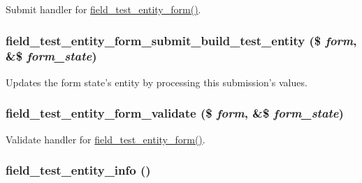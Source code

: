 \label{field__test_8entity_8inc_afd81eae9834f97ca915796f2e9240ef5}
Submit handler for \hyperlink{field__test_8entity_8inc_a85a2c69ad395d255d448d7f3d72ba9f3}{field\_\-test\_\-entity\_\-form()}. \hypertarget{field__test_8entity_8inc_aee4f6831ba19841da21548d86406db01}{
\subsubsection[{field\_\-test\_\-entity\_\-form\_\-submit\_\-build\_\-test\_\-entity}]{\setlength{\rightskip}{0pt plus 5cm}field\_\-test\_\-entity\_\-form\_\-submit\_\-build\_\-test\_\-entity (\$ {\em form}, \/  \&\$ {\em form\_\-state})}}
\label{field__test_8entity_8inc_aee4f6831ba19841da21548d86406db01}
Updates the form state's entity by processing this submission's values. \hypertarget{field__test_8entity_8inc_a223ebb8c79571c498638f329fdefac54}{
\subsubsection[{field\_\-test\_\-entity\_\-form\_\-validate}]{\setlength{\rightskip}{0pt plus 5cm}field\_\-test\_\-entity\_\-form\_\-validate (\$ {\em form}, \/  \&\$ {\em form\_\-state})}}
\label{field__test_8entity_8inc_a223ebb8c79571c498638f329fdefac54}
Validate handler for \hyperlink{field__test_8entity_8inc_a85a2c69ad395d255d448d7f3d72ba9f3}{field\_\-test\_\-entity\_\-form()}. \hypertarget{field__test_8entity_8inc_a51bbbb4d2a09faac17afe13915e29225}{
\subsubsection[{field\_\-test\_\-entity\_\-info}]{\setlength{\rightskip}{0pt plus 5cm}field\_\-test\_\-entity\_\-info ()}}
